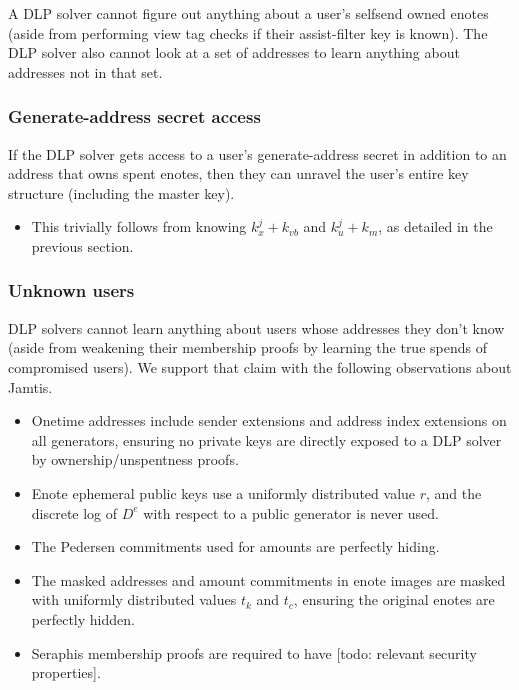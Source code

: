 A DLP solver cannot figure out anything about a user's selfsend owned enotes (aside from performing view tag checks if their assist-filter key is known). The DLP solver also cannot look at a set of addresses to learn anything about addresses not in that set.

\subsubsection{Generate-address secret access}
\label{subsubsec:jamtis-forward-secrecy-generate-address-access}

If the DLP solver gets access to a user's generate-address secret in addition to an address that owns spent enotes, then they can unravel the user's entire key structure (including the master key).
\begin{itemize}
    \item This trivially follows from knowing $k^j_x + k_{vb}$ and $k^j_u + k_m$, as detailed in the previous section.
\end{itemize}

\subsubsection{Unknown users}
\label{subsubsec:jamtis-forward-secrecy-unknown-users}

DLP solvers cannot learn anything about users whose addresses they don't know (aside from weakening their membership proofs by learning the true spends of compromised users). We support that claim with the following observations about Jamtis.
\begin{itemize}
    \item Onetime addresses include sender extensions and address index extensions on all generators, ensuring no private keys are directly exposed to a DLP solver by ownership/unspentness proofs.
    \item Enote ephemeral public keys use a uniformly distributed value $r$, and the discrete log of $D^e$ with respect to a public generator is never used.
    \item The Pedersen commitments used for amounts are perfectly hiding.
    \item The masked addresses and amount commitments in enote images are masked with uniformly distributed values $t_k$ and $t_c$, ensuring the original enotes are perfectly hidden.
    \item Seraphis membership proofs are required to have [todo: relevant security properties].
\end{itemize}


